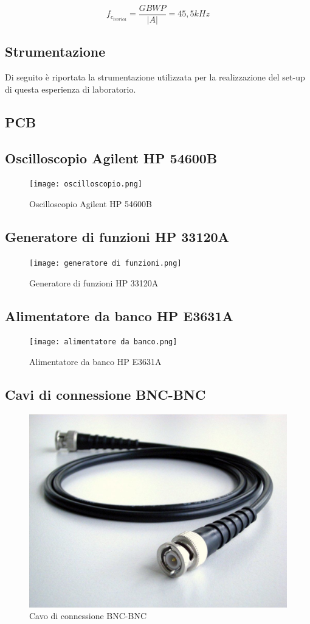 \[f_{c_{teorica}}=\frac{GBWP}{|A|}=45,5kHz\]
\subsection{Strumentazione}
Di seguito è riportata la strumentazione utilizzata per la realizzazione del set-up di questa esperienza di laboratorio.

\subsection*{\textbf{PCB}}

\subsection*{\textbf{Oscilloscopio Agilent HP 54600B}}
\begin{figure}[h]
    \centering
    \texttt{[image: oscilloscopio.png]}
    \caption{Oscilloscopio Agilent HP 54600B}
    \label{fig:enter-label}
\end{figure}
\FloatBarrier
\subsection*{\textbf{Generatore di funzioni HP 33120A}}
\begin{figure}[h]
    \centering
    \texttt{[image: generatore di funzioni.png]}
    \caption{Generatore di funzioni HP 33120A}
    \label{fig:enter-label}
\end{figure}
\FloatBarrier
\subsection*{\textbf{Alimentatore da banco HP E3631A}}
\begin{figure}[h]
    \centering
    \texttt{[image: alimentatore da banco.png]}
    \caption{Alimentatore da banco HP E3631A}
    \label{fig:HPE3631A}
\end{figure}
\FloatBarrier
\subsection*{\textbf{Cavi di connessione BNC-BNC}}
\begin{figure}[h]
    \centering
    \includegraphics[width=0.75\linewidth]{media/cavoBNC.png}
    \caption{Cavo di connessione BNC-BNC}
    \label{fig:enter-label}
\end{figure}
\FloatBarrier
\clearpage

